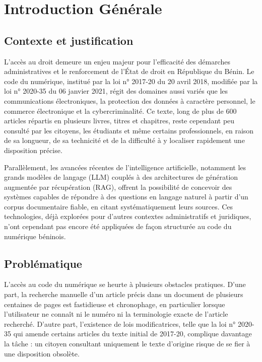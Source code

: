 \chapter*{Introduction Générale}

\section*{ Contexte et justification}

L'accès au droit demeure un enjeu majeur pour l'efficacité des démarches administratives et le renforcement de l'État de droit en République du Bénin. Le code du numérique, institué par la loi n° 2017-20 du 20 avril 2018, modifiée par la loi n° 2020-35 du 06 janvier 2021, régit des domaines aussi variés que les communications électroniques, la protection des données à caractère personnel, le commerce électronique et la cybercriminalité. Ce texte, long de plus de 600 articles répartis en plusieurs livres, titres et chapitres, reste cependant peu consulté par les citoyens, les étudiants et même certains professionnels, en raison de sa longueur, de sa technicité et de la difficulté à y localiser rapidement une disposition précise.

Parallèlement, les avancées récentes de l'intelligence artificielle, notamment les grands modèles de langage (LLM) couplés à des architectures de génération augmentée par récupération (RAG), offrent la possibilité de concevoir des systèmes capables de répondre à des questions en langage naturel à partir d'un corpus documentaire fiable, en citant systématiquement leurs sources. Ces technologies, déjà explorées pour d'autres contextes administratifs et juridiques, n'ont cependant pas encore été appliquées de façon structurée au code du numérique béninois.




\section*{ Problématique}

L'accès au code du numérique se heurte à plusieurs obstacles pratiques. D'une part, la recherche manuelle d'un article précis dans un document de plusieurs centaines de pages est fastidieuse et chronophage, en particulier lorsque l'utilisateur ne connaît ni le numéro ni la terminologie exacte de l'article recherché. D'autre part, l'existence de lois modificatrices, telle que la loi n° 2020-35 qui amende certains articles du texte initial de 2017-20, complique davantage la tâche : un citoyen consultant uniquement le texte d'origine risque de se fier à une disposition obsolète.

